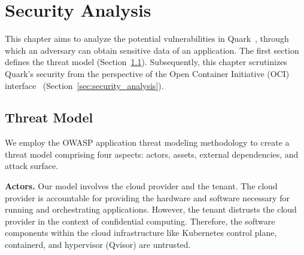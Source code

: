 \chapter{Security Analysis}
\label{sec:security_analyse}




This chapter aims to analyze the potential vulnerabilities in Quark~\cite*{quark}, through which an adversary can obtain sensitive data of an application. The first section defines the threat model (Section~\ref{sec:Threat_model}). 
Subsequently, this chapter scrutinizes Quark's security from the perspective of the Open Container Initiative (OCI) interface~\cite*{oci-runtime-spec} (Section~\ref{sec:security_analysis}).

\section{Threat Model}
\label{sec:Threat_model}
We employ the OWASP application threat modeling methodology\cite*{OWASP_Threat_Modeling} to create a threat model comprising four aspects: actors, assets, external dependencies, and attack surface. 

\textbf{Actors.} Our model involves the cloud provider and the tenant. The cloud provider is accountable for providing the hardware and software necessary for running and orchestrating applications. However, the tenant distrusts the cloud provider in the 
context of confidential computing. Therefore, the software components within the cloud infrastructure like Kubernetes control plane\cite*{k8s}, containerd\cite*{containerd}, and hypervisor (Qvisor) are untrusted.

